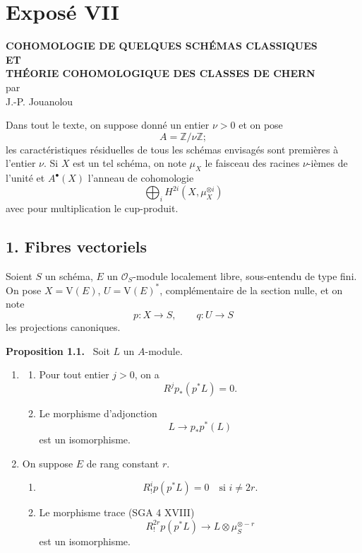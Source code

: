 \documentclass[11pt]{article}
\newenvironment{statement}[1]{\par\medskip\noindent\textbf{#1.}\ }{\par\medskip}
\providecommand{\V}{\mathrm V}
\begin{document}
\section*{Exposé VII}

\begin{center}
\textbf{COHOMOLOGIE DE QUELQUES SCHÉMAS CLASSIQUES}\\[0.5em]
\textbf{ET}\\[0.5em]
\textbf{THÉORIE COHOMOLOGIQUE DES CLASSES DE CHERN}\\[1em]
par\\[0.5em]
J.-P. Jouanolou
\end{center}

Dans tout le texte, on suppose donné un entier $\nu>0$ et on pose
\[
A=\mathbb Z/\nu\mathbb Z;
\]
les caractéristiques résiduelles de tous les schémas envisagés sont premières à l'entier $\nu$. Si $X$ est un tel schéma, on note $\mu_X$ le faisceau des racines $\nu$-ièmes de l'unité et $A^{\bullet}(X)$ l'anneau de cohomologie
\[
\bigoplus_i H^{2i}(X,\mu_X^{\otimes i})
\]
avec pour multiplication le cup-produit.

\subsection*{1. Fibres vectoriels}

Soient $S$ un schéma, $E$ un $\mathcal O_S$-module localement libre, sous-entendu de type fini. On pose $X=\V(E)$, $U=\V(E)^*$, complémentaire de la section nulle, et on note
\[
p:X\to S,
\qquad
q:U\to S
\]
les projections canoniques.

\begin{statement}{Proposition 1.1}
Soit $L$ un $A$-module.
\begin{enumerate}[label=(\roman*)]
\item
\begin{enumerate}[label=\alph*)]
\item Pour tout entier $j>0$, on a
\[
R^j p_*(p^*L)=0.
\]
\item Le morphisme d'adjonction
\[
L\longrightarrow p_*p^*(L)
\]
est un isomorphisme.
\end{enumerate}
\item On suppose $E$ de rang constant $r$.
\begin{enumerate}[label=\alph*)]
\item
\[
R_!^i p(p^*L)=0\quad\text{si }i\ne 2r.
\]
\item Le morphisme trace (SGA 4 XVIII)
\[
R_!^{2r}p(p^*L)\longrightarrow L\otimes\mu_S^{\otimes -r}
\]
est un isomorphisme.
\end{enumerate}
\end{enumerate}
\end{statement}
\end{document}
